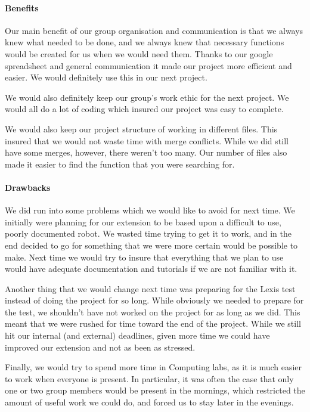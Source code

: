 \documentclass[10pt]{article}
\begin{document}
\paragraph{Benefits}
Our main benefit of our group organisation and communication is that we always knew what needed to be done, and we always knew that necessary functions would be created for us when we would need them. Thanks to our google spreadsheet and general communication it made our project more efficient and easier. We would definitely use this in our next project.

We would also definitely keep our group’s work ethic for the next project. We would all do a lot of coding which insured our project was easy to complete.

We would also keep our project structure of working in different files. This insured that we would not waste time with merge conflicts. While we did still have some merges, however, there weren’t too many. Our number of files also made it easier to find the function that you were searching for. 

\paragraph{Drawbacks}
We did run into some problems which we would like to avoid for next time. We initially were planning for our extension to be based upon a difficult to use, poorly documented robot. We wasted time trying to get it to work, and in the end decided to go for something that we were more certain would be possible to make. Next time we would try to insure that everything that we plan to use would have adequate documentation and tutorials if we are not familiar with it.

Another thing that we would change next time was preparing for the Lexis test instead of doing the project for so long. While obviously we needed to prepare for the test, we shouldn’t have not worked on the project for as long as we did. This meant that we were rushed for time toward the end of the project. While we still hit our internal (and external) deadlines, given more time we could have improved our extension and not as been as stressed.

Finally, we would try to spend more time in Computing labs, as it is much easier to work when everyone is present. In particular, it was often the case that only one or two group members would be present in the mornings, which restricted the amount of useful work we could do, and forced us to stay later in the evenings.
\end{document}
